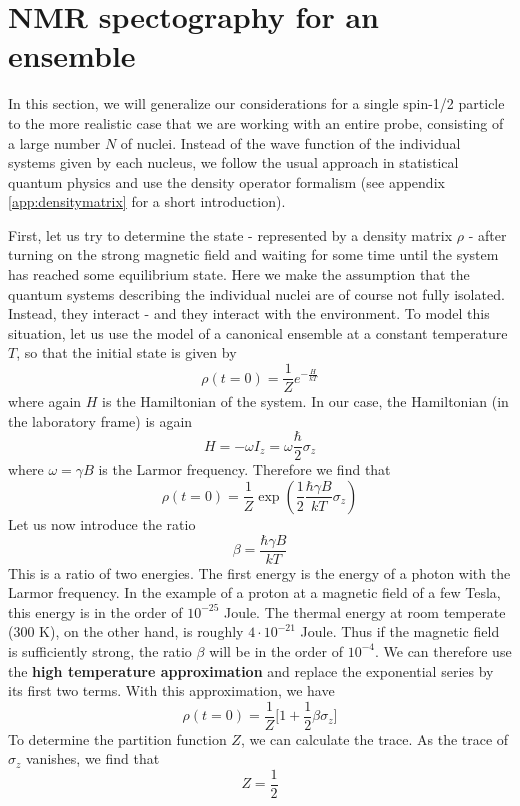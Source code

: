 \documentclass[a4paper, draft]{article}
\theoremstyle{own}
\theoremstyle{remark}
\begin{document}
\section{NMR spectography for an ensemble}

In this section, we will generalize our considerations for a single spin-1/2 particle to the more realistic case that we are working with an entire probe, consisting of a large number $N$ of nuclei. Instead of the wave function of the individual systems given by each nucleus, we follow the usual approach in statistical quantum physics and use the density operator formalism (see appendix \ref{app:densitymatrix} for a short introduction). 

First, let us try to determine the state - represented by a density matrix $\rho$ - after turning on the strong magnetic field and waiting for some time until the system has reached some equilibrium state. Here we make the assumption that the quantum systems describing the individual nuclei are of course not fully isolated. Instead, they interact - and they interact with the environment. To model this situation, let us use the model of a canonical ensemble at a constant temperature $T$, so that the initial state is given by
$$
\rho(t=0) = \frac{1}{Z} e^{-\frac{H}{kT}}
$$
where again $H$ is the Hamiltonian of the system. In our case, the Hamiltonian (in the laboratory frame) is again 
$$
H = - \omega I_z = \omega \frac{\hbar}{2} \sigma_z
$$
where $\omega = \gamma B$ is the Larmor frequency. Therefore we find that
$$
\rho(t=0) = \frac{1}{Z} \exp (\frac{1}{2} \frac{\hbar \gamma B}{kT} \sigma_z)
$$
Let us now introduce the ratio
$$
\beta = \frac{\hbar \gamma B}{kT}
$$
This is a ratio of two energies. The first energy is the energy of a photon with the Larmor frequency. In the example of a proton at a magnetic field of a few Tesla, this energy is in the order of $10^{-25}$ Joule. The thermal energy at room temperate (300 K), on the other hand, is roughly $4 \cdot 10^{-21}$ Joule. Thus if the magnetic field is sufficiently strong, the ratio $\beta$ will be in the order of $10^{-4}$. We can therefore use the {\bf high temperature approximation} and replace the exponential series by its first two terms. With this approximation, we have
$$
\rho(t=0) = \frac{1}{Z} \big[ 1 + \frac{1}{2} \beta \sigma_z \big] 
$$ 
To determine the partition function $Z$, we can calculate the trace. As the trace of $\sigma_z$ vanishes, we find that 
$$
Z = \frac{1}{2}
$$
\end{document}
